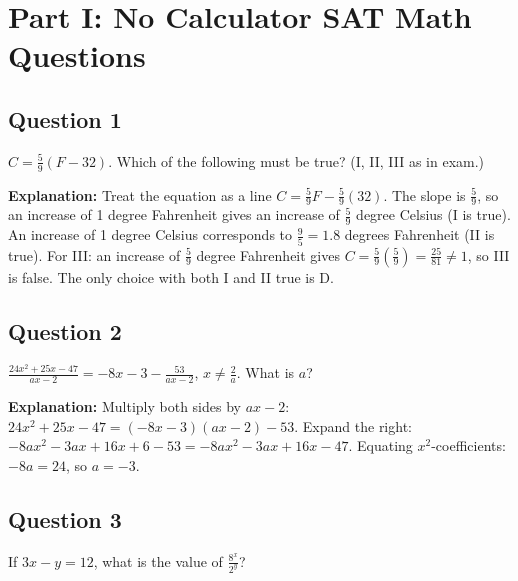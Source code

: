 \pagestyle{fancy}
\fancyhf{}
\rhead{}
\lfoot{}
\renewcommand{\headrulewidth}{0.4pt}
\renewcommand{\footrulewidth}{0.4pt}


\section*{Part I: No Calculator SAT Math Questions}

\subsection*{Question 1}
$C = \frac{5}{9}(F - 32)$. Which of the following must be true? (I, II, III as in exam.)

\textbf{Explanation:} Treat the equation as a line $C = \frac{5}{9}F - \frac{5}{9}(32)$. The slope is $\frac{5}{9}$, so an increase of 1 degree Fahrenheit gives an increase of $\frac{5}{9}$ degree Celsius (I is true). An increase of 1 degree Celsius corresponds to $\frac{9}{5} = 1.8$ degrees Fahrenheit (II is true). For III: an increase of $\frac{5}{9}$ degree Fahrenheit gives $C = \frac{5}{9}(\frac{5}{9}) = \frac{25}{81} \neq 1$, so III is false. The only choice with both I and II true is D.

\subsection*{Question 2}
$\displaystyle \frac{24x^2 + 25x - 47}{ax - 2} = -8x - 3 - \frac{53}{ax - 2}$, $x \neq \frac{2}{a}$. What is $a$?

\textbf{Explanation:} Multiply both sides by $ax - 2$:
$24x^2 + 25x - 47 = (-8x - 3)(ax - 2) - 53$. Expand the right: $-8ax^2 - 3ax + 16x + 6 - 53 = -8ax^2 - 3ax + 16x - 47$. Equating $x^2$-coefficients: $-8a = 24$, so $a = -3$.

\subsection*{Question 3}
If $3x - y = 12$, what is the value of $\displaystyle \frac{8^x}{2^y}$?

